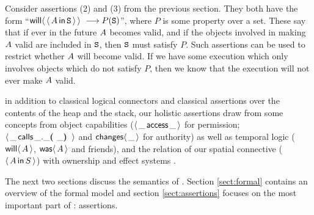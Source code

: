 Consider assertions (2) and (3) from the previous section. They
  both have the form ``$\Future {\Using {\A} {\SF}}\ \longrightarrow P(\SF)$'',
  where $P$ is some property over a set. These  say that if
  ever in the future $A$ becomes valid, and if the objects involved
  in making $A$ valid are included in ${{\mbox{\tt{S}}}}$, then ${{\mbox{\tt{S}}}}$ must satisfy
  $P$. Such assertions can be used to restrict whether $A$ will
  become valid. If we have some execution which only involves objects which do not satisfy $P$, then we know that the execution will not ever make $A$ valid.


 
 in addition to classical 
logical connectors and classical assertions over the contents of the heap and the stack, 
our holistic assertions draw from some concepts from object capabilities
($\langle\, \_\, \mathsf{access}\, \_\, \rangle$  for  permission; $\langle\, \_\, \mathsf{calls}\, \_.\_{\mbox{\tt{\mbox{\tt{\bf{( }}}}}}\_{\mbox{\tt{\mbox{\tt{\bf{) }}}}}}\, \rangle$ and  ${\mathsf{changes}}\langle\,\_\,\rangle$ for
authority) 
as well as temporal logic (${\mathsf{will}}\langle \,A\,\rangle$, ${\mathsf{was}}\langle \,A\,\rangle$ and friends), and the relation of
our spatial connective ($\langle\, A\, \mathsf{in}\, S\, \rangle$)  with ownership and effect
systems \cite{typeEffect,ownalias,ownEncaps}.

The next two sections  discuss the semantics of \Chainmail. Section \ref{sect:formal}
contains an overview of the formal model and section \ref{sect:assertions} focuses on the most important part of \Chainmail : assertions.




